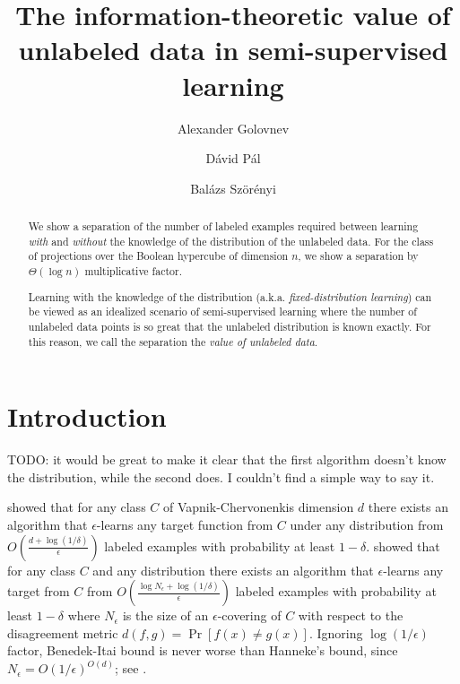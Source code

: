 \documentclass[10pt]{article}
\begin{document}
\title{The information-theoretic value of unlabeled data in semi-supervised learning}
\author{Alexander Golovnev \and D\'avid P\'al \and Bal\'azs Sz\"or\'enyi}

\maketitle

\begin{abstract}
We show a separation of the number of labeled examples required between learning \emph{with}
and \emph{without} the knowledge of the distribution of the unlabeled data. For
the class of projections over the Boolean hypercube of dimension $n$, we show a
separation by $\Theta(\log n)$ multiplicative factor.

Learning with the knowledge of the distribution (a.k.a. \emph{fixed-distribution
learning}) can be viewed as an idealized scenario of semi-supervised learning
where the number of unlabeled data points is so great that the unlabeled
distribution is known exactly. For this reason, we call the separation
the \emph{value of unlabeled data}.
\end{abstract}


\section{Introduction}
TODO: it would be great to make it clear that the first algorithm doesn't know the distribution, while the second does. I couldn't find a simple way to say it.

\cite{Hanneke-2016} showed that for any class $C$ of Vapnik-Chervonenkis
dimension $d$ there exists an algorithm that $\epsilon$-learns any target
function from $C$ under any distribution from $O\left(\frac{d +
\log(1/\delta)}{\epsilon}\right)$ labeled examples with probability at least
$1-\delta$. \cite{Benedek-Itai-1991} showed that for any class $C$ and any
distribution there exists an algorithm that $\epsilon$-learns any target from
$C$ from $O \left( \frac{\log N_\epsilon + \log (1/\delta)}{\epsilon}\right)$ labeled
examples with probability at least $1-\delta$ where $N_\epsilon$ is the size of an
$\epsilon$-covering of $C$ with respect to the disagreement metric $d(f,g) =
\Pr[f(x) \neq g(x)]$. Ignoring $\log(1/\epsilon)$ factor, Benedek-Itai bound
is never worse than Hanneke's bound, since $N_\epsilon = O(1/\epsilon)^{O(d)}$; see
\cite{Dudley-1978}.
\end{document}
